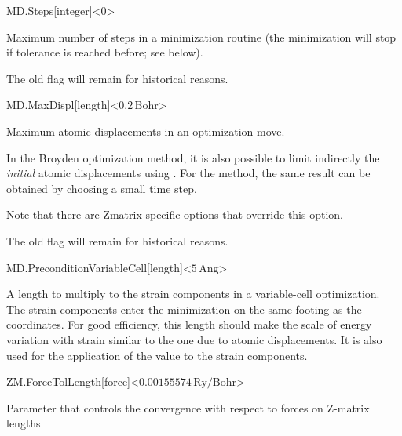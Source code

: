 \begin{fdfentry}{MD.Steps}[integer]<0>
  
  Maximum number of steps in a minimization routine
  (the minimization will stop if tolerance is reached before; see
   below).

  \note The old flag  will remain for historical
  reasons.

\end{fdfentry}

\begin{fdfentry}{MD.MaxDispl}[length]<$0.2\,\mathrm{Bohr}$>
  
  Maximum atomic displacements in an optimization move.

  In the Broyden optimization method, it is also possible to limit
  indirectly the \textit{initial\/} atomic displacements using
  . For the  method, the
  same result can be obtained by choosing a small time step.

  Note that there are Zmatrix-specific options that override this option.

  \note The old flag  will remain for historical
  reasons.

\end{fdfentry}

\begin{fdfentry}{MD.PreconditionVariableCell}[length]<$5\,\mathrm{Ang}$>
  
  A length to multiply to the strain components in a variable-cell
  optimization. The strain components enter the minimization on the
  same footing as the coordinates. For good efficiency, this length
  should make the scale of energy variation with strain similar to the
  one due to atomic displacements. It is also used for the application
  of the  value to the strain components.

\end{fdfentry}


\begin{fdfentry}{ZM.ForceTolLength}[force]<$0.00155574\,\mathrm{Ry/Bohr}$>
  
  Parameter that controls the convergence with respect to forces on
  Z-matrix lengths

\end{fdfentry}


